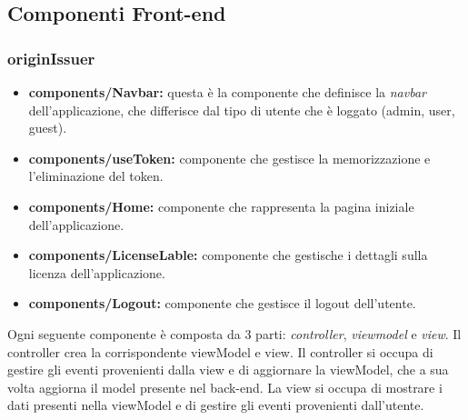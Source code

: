 \subsection{Componenti Front-end}
\subsubsection{originIssuer} 

\begin{itemize}
    \item \textbf{components/Navbar:} questa è la componente che definisce la \textit{navbar} dell'applicazione, che differisce dal tipo di utente che è loggato (admin, user, guest).
    \item \textbf{components/useToken:} componente che gestisce la memorizzazione e l'eliminazione del token.
    \item \textbf{components/Home:} componente che rappresenta la pagina iniziale dell'applicazione.
    \item \textbf{components/LicenseLable:} componente che gestische i dettagli sulla licenza dell'applicazione.
    \item \textbf{components/Logout:} componente che gestisce il logout dell'utente.
\end{itemize}

Ogni seguente componente è composta da 3 parti: \textit{controller}, \textit{viewmodel} e \textit{view}. Il controller crea la corrispondente
viewModel e view. Il controller si occupa di gestire gli eventi provenienti dalla view e di aggiornare la viewModel, che a sua volta aggiorna 
il model presente nel back-end. La view si occupa di mostrare i dati presenti nella viewModel e di gestire gli eventi provenienti dall'utente.

